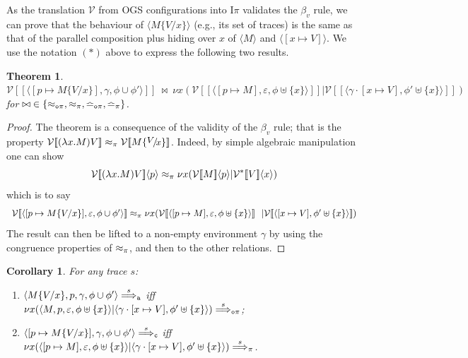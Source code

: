 \documentclass[11pt,a4paper]{amsart}
\theoremstyle{plain}
\theoremstyle{definition}
\theoremstyle{defC}
\theoremstyle{thmC}
\theoremstyle{plain}
\numberwithin{equation}{section}
\newcommand{\tr}{s}
\newcommand{\obj}[1]{\langle #1 \rangle}
\def\app#1#2{#1\obj{#2}}                    %
\newcommand{\rmm}[1]{{\tt{\lowercase{#1}}}}
\newcommand{\genArr}[2]{\mathrel{\stackrel{{#1}}{\Longrightarrow}_{\rmm{\lowercase{#2}}}}}  %
\newcommand{\ArrPI}[1]{\genArr{#1}{\pi}}   %
\newcommand{\ArrA}[1]{\genArr{#1}{A}}  %
\newcommand{\ArrC}[1]{\genArr{#1}{C}}   %
\newcommand{\ArrN}[1]{\genArr{#1}{o\pi}}  %
\newcommand{\genTE}[1]{\mathrel{\bumpeq_{\rmm{\lowercase{#1}}}}}       %
\newcommand{\genwb}[1]{\mathrel{\approx_{\rmm{\lowercase{#1}}}}}       %
\newcommand{\wbPI}{\genwb{\pi}}       %
\newcommand{\wbOPI}{\genwb{o\pi}}       %
\newcommand{\TEPI}{\genTE{\pi}}       %
\newcommand{\TEN}{\genTE{o\pi}}     %
\newcommand{\encoIa}[2]{\cbvSymb \app{[\! [ #1 ] \! ]}{#2}  }
\newcommand{\encoIVa}[2]{\cbvSymb^\variant \app{[\! [ #1 ] \! ]}{#2}  }
\newcommand{\cbvSymb}{{\mathcal {V}}}
\newcommand{\encoEnvI}[1]{ \cbvSymb[\! [ #1 ] \! ]  } %
\newcommand{\encoConI}{\encoEnvI} %
\newcommand{\variant}{*} %
\newcommand{\Intp}{\mbox{I$\pi$}\xspace}   %
\newcommand{\piI}{\Intp}   %
\def\sub#1#2{\{\raisebox{.5ex}{\small$#1$}\! / \!\mbox{\small$#2$}\}}
\newcommand{\emptymap}{\varepsilon}
\newcommand{\pmap}[2]{[#1 \mapsto #2]}
\newcommand{\subst}[2]{\{#2 / #1 \}}
\newcommand{\conf}[1]{\langle #1\rangle}
\theoremstyle{plain}
\newtheorem{theorem}[thm]{Theorem}
\newtheorem{corollary}[thm]{Corollary}
\theoremstyle{definition}
\newtheorem{remark}[thm]{Remark}
\begin{document}

As the translation $\cbvSymb$ from OGS configurations into
 $\piI$
 validates the  $\beta_v$ rule, we can prove  that the behaviour of 
 $\conf{M\subst{x}{V}}$
(e.g., its set of traces)
is the same as that of the parallel composition plus hiding over $x$
of $\conf{M}$ and $\conf{\pmap{x}{V}}$.
We use the notation $(*)$  above to express the following two results. 

\begin{theorem} %
$
  \encoConI{\conf{\pmap{p}{M\subst{x}{V}},\gamma,\phi\cup\phi'}} 
\ {\bowtie}\
 \nu x(
  \encoConI{\conf{\pmap{p}{M},\emptymap,\phi \uplus \{x\}}}
     | \encoConI{\conf{\gamma \cdot\pmap{x}{V},\phi' \uplus \{x\}}})
$
for $ \bowtie \;  \in \{ \wbOPI, \wbPI, \TEN,\TEPI\}$. 
 \end{theorem}  

\begin{proof}
The theorem is a  consequence of the validity of the $\beta_v$ rule; that
is the property $  \encoConI{ (\lambda x. M) V }  \wbPI   \encoConI{  M \sub V x }  $. 
Indeed, by simple algebraic manipulation one can show 
$$   \encoIa{(\lambda x. M) V} p 
 \wbPI  \nu x( \encoIa M p |   \encoIVa {V} x)$$
which is to say
$$ 
\begin{array}{lc}
  \encoConI{\conf{\pmap{p}{M\subst{x}{V}},\emptymap ,\phi\cup\phi'}} 
 \wbPI
 \nu x(
   \encoConI{\conf{\pmap{p}{M},\emptymap,\phi \uplus \{x\}}} 
     \ \ | \encoConI{\conf{[x \mapsto V],\phi' \uplus \{x\}}})
\end{array} 
$$
The result can then be lifted to a  non-empty environment $ \gamma $ by using the congruence
properties of $\wbPI$, and then to the other relations.
\end{proof}

\begin{corollary}
For any trace $\tr$:
 \begin{enumerate}
 \item  $\conf{M\subst{x}{V},p,\gamma,\phi\cup\phi'} \ArrA{\tr}$
 iff $\nu x(
   \conf{M,p,\emptymap,\phi \uplus \{x\}}
      | \conf{\gamma \cdot\pmap{x}{V},\phi' \uplus \{x\}}) \ArrN{\tr}$;
 \item $\conf{\pmap{p}{M\subst{x}{V}},\gamma,\phi\cup\phi'} \ArrC{\tr}$
 iff $\nu x(
   \conf{\pmap{p}{M},\emptymap,\phi \uplus \{x\}}
      | \conf{\gamma \cdot\pmap{x}{V},\phi' \uplus \{x\}}) \ArrPI{\tr}$.
\end{enumerate}
\end{corollary}
\end{document}
